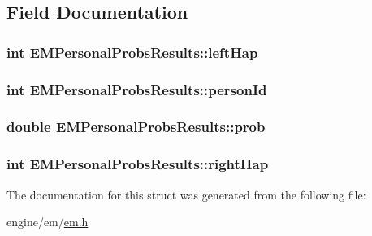 \subsection{Field Documentation}
\hypertarget{structEMPersonalProbsResults_ae4a36f80c0146b7c5b712fb2d6d71138}{
\subsubsection[{leftHap}]{\setlength{\rightskip}{0pt plus 5cm}int {\bf EMPersonalProbsResults::leftHap}}}
\label{structEMPersonalProbsResults_ae4a36f80c0146b7c5b712fb2d6d71138}
\hypertarget{structEMPersonalProbsResults_ad656d2e7ccb659689b21016c28b58ff4}{
\subsubsection[{personId}]{\setlength{\rightskip}{0pt plus 5cm}int {\bf EMPersonalProbsResults::personId}}}
\label{structEMPersonalProbsResults_ad656d2e7ccb659689b21016c28b58ff4}
\hypertarget{structEMPersonalProbsResults_ae9e07e1bcc31ff1622b96dcc8f5e86d1}{
\subsubsection[{prob}]{\setlength{\rightskip}{0pt plus 5cm}double {\bf EMPersonalProbsResults::prob}}}
\label{structEMPersonalProbsResults_ae9e07e1bcc31ff1622b96dcc8f5e86d1}
\hypertarget{structEMPersonalProbsResults_a3bacb2357ef66f91aeb3feffe1666e92}{
\subsubsection[{rightHap}]{\setlength{\rightskip}{0pt plus 5cm}int {\bf EMPersonalProbsResults::rightHap}}}
\label{structEMPersonalProbsResults_a3bacb2357ef66f91aeb3feffe1666e92}


The documentation for this struct was generated from the following file:\begin{DoxyCompactItemize}
\item 
engine/em/\hyperlink{em_8h}{em.h}\end{DoxyCompactItemize}
